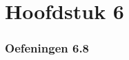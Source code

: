 \documentclass[lineaire_algebra_oplossingen.tex]{subfiles}
\begin{document}
\part{Hoofdstuk 6}
\section{Oefeningen 6.8}
\end{document}
